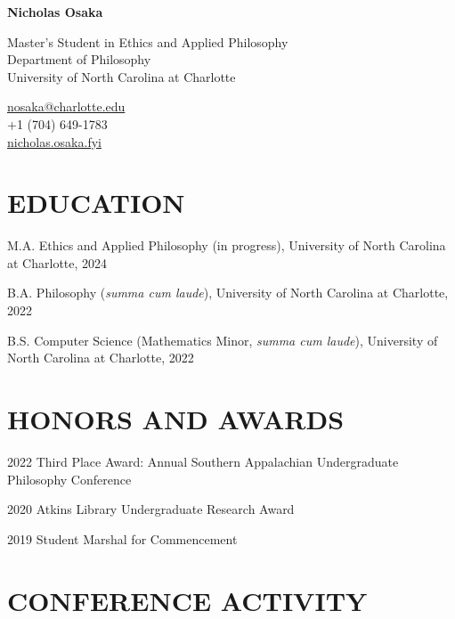 \documentclass{article}
\begin{document}
\raggedright{}
\huge{\textbf{Nicholas Osaka}}
\normalsize

\vspace{1em}
\begin{minipage}[t]{0.700\textwidth}
    Master's Student in Ethics and Applied Philosophy\\
    Department of Philosophy \\
    University of North Carolina at Charlotte
\end{minipage}
\begin{minipage}[t]{0.275\textwidth}
    \flushright{}
    \href{mailto:nosaka@charlotte.edu}{nosaka@charlotte.edu} \\
    +1 (704) 649-1783\\
    \href{https://nicholas.osaka.fyi}{nicholas.osaka.fyi}
\end{minipage}

\section*{\normalsize{\MakeUppercase{Education}}}
\begin{tablist}
    \item[M.A.]  \tab{}Ethics and Applied Philosophy (in progress), University of North Carolina at Charlotte, 2024
    \item[B.A.]  \tab{}Philosophy (\textit{summa cum laude}), University of North Carolina at Charlotte, 2022
    \item[B.S.]  \tab{}Computer Science (Mathematics Minor, \textit{summa cum laude}), University of North Carolina at Charlotte, 2022
\end{tablist}

\section*{\normalsize{\MakeUppercase{Honors and Awards}}}
\begin{tablist}
    \item[2022] \tab{}Third Place Award:  Annual Southern Appalachian Undergraduate Philosophy Conference
    \item[2020] \tab{}Atkins Library Undergraduate Research Award
    \item[2019] \tab{}Student Marshal for Commencement
\end{tablist}

\section*{\normalsize{\MakeUppercase{Conference Activity}}}
\end{document}
